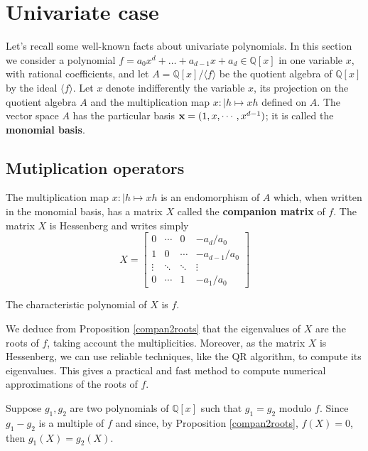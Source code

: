 \documentclass{standalone}
\begin{document}
\section{Univariate case}
\label{univariate}
Let's recall some well-known facts about univariate polynomials. In this section we consider a polynomial $f = a_0x^d + \dots + a_{d-1}x + a_d \in \mathbb{Q}[x]$ in one variable $x$, with rational coefficients, and let $A = \mathbb{Q}[x]/\langle f \rangle$ be the quotient algebra of $\mathbb{Q}[x]$ by the ideal $\langle f \rangle$.
Let $x$ denote indifferently the variable $x$, its projection on the quotient algebra $A$ and the multiplication map $x : \left\vert h \mapsto xh \right.$ defined on $A$. The vector space $A$ has the particular basis $\bold{x} = (1, x,\cdots, x^{d-1})$; it is called the {\bf monomial basis}.

\subsection{Mutiplication operators}
The multiplication map $x : \left\vert h \mapsto xh \right.$ is an endomorphism of $A$ which, when written in the monomial basis, has a matrix $X$ called the {\bf companion matrix} of $f$. The matrix $X$ is Hessenberg and writes simply
\begin{equation}
\label{compan}
X =
\begin{bmatrix}
	0 & \cdots & 0 & -a_d/a_0 \\
	1 & 0 & \cdots & -a_{d-1}/a_0 \\
	\vdots  & \ddots  & \ddots & \vdots  \\
	0 & \cdots & 1 & -a_1/a_0
\end{bmatrix}
\end{equation}
\begin{prop}
\label{compan2roots}
The characteristic polynomial of $X$ is $f$.
\end{prop}

\begin{rem}
We deduce from Proposition \ref{compan2roots} that the eigenvalues of $X$ are the roots of $f$, taking account the multiplicities. Moreover, as the matrix $X$ is Hessenberg, we can use reliable techniques, like the QR algorithm, to compute its eigenvalues. This gives a practical and fast method to compute numerical approximations of the roots of $f$. 
\end{rem}

\begin{rem}
\label{g_1=g_2}
Suppose $g_1, g_2$ are two polynomials of $\mathbb{Q}[x]$ such that $g_1 = g_2$ modulo $f$. Since $g_1-g_2$ is a multiple of $f$ and since, by Proposition \ref{compan2roots}, $f(X) = 0$, then $g_1(X) = g_2(X)$.
\end{rem}
\end{document}
